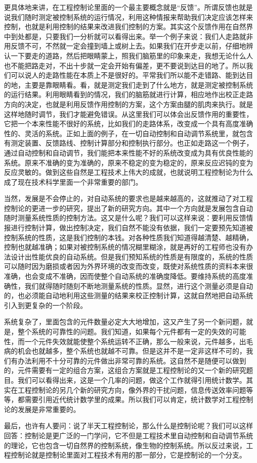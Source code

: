 更具体地来讲，在工程控制论里面的一个最主要概念就是“反馈”。所谓反馈也就是说我们随时测定被控制系统的运行情况，利用这种情报来帮助我们决定应该怎样来控制，也就是利用控制的结果来改进我们控制的方案。其实这个反馈作用在自然界中到处都是，只要我们一分析就可以看得出来。举一个例子来说：我们人走路就非用反馈不可，不然就一定会撞到墙上或树上去。如果我们在开步走以前，仔细地辨认一下要走的道路，然后把眼睛蒙上，照我们脑筋里的印象来走，我想无论什么人也不能把路走对，不出十步就一定会开始有偏差，更不要说到达目的地了。所以我们可以说人的走路性能在本质上不是很好的。平常我们所以能不走错路、能到达目的地，主要是靠眼睛看。看，就是测定我们走到了什么地方，就是测定被控制系统的运行结果。利用眼睛看到的情况，我们的脑筋就进行计算，相应地作出校正走路方向的决定，也就是利用反馈作用控制的方案，这个方案由腿的肌肉来执行。就是这样地随时调节，我们才能避免错误。从这里我们可以体会出反馈作用的重要性，它把一个本来性能不很好的系统，比如我们的走路体系，改变成一个具有高度准确性的、灵活的系统。正如上面的例子，在一切自动控制和自动调节系统里，就包含有测定装置、反馈路线、控制计算部分和控制执行部分。也正如走路这一个例子，通过自动控制和自动调节，我们能把本来性能不好的系统改变成为具有优良性能的系统。原来不准确的变为准确的，原来不稳定的变为稳定的，原来反应迟钝的变为反应灵敏的。做到这些自然是工程技术上伟大的成就，也就说明工程控制论为什么成了现在技术科学里面一个非常重要的部门。

当然，发展是不会停止的，对自动系统的要求也是越来越高的，这就推动了对工程控制论的更进一步的研究，提出了新的研究方向。其中一个方向就是发展包含自动随时测量系统性质的控制方法。这又是什么呢？我们可以这样来说：要利用反馈情报进行控制计算，做出控制决定，我们自然不能没有依据，我们一定要预先知道被控制系统的性质，这是我们控制的本钱。对各种性质我们知道得越清楚、越精确，控制也就越准确；如果对被控制系统的情况糊里糊涂，就是再好的工程师也没有办法设计出性能优良的自动系统。但是我们预知系统的性质是有限度的，系统的性质可以随时因为磨损或者因为外界环境的改变而改变，既使对系统性质的资料本来很准确，也会变成不准确，因而使整个自动系统的准确度降低。要维持系统的高度准确性，我们就得随时随刻不断地测量系统的性质。显然，进行这个测量必须是自动的，也必须能自动地利用这些测量的结果来校正控制计算，这就自然地把自动系统引入到更复杂的一个阶段。

系统复杂了，里面包含的元件数量必定大大地增加，这又产生了另一个新问题，就是，整个系统的可靠性的问题。我们知道，如果每个元件都有一定的失效的可能性，而一个元件失效就能使整个系统运转不正确，那么一般来说，元件越多，出毛病的机会也就越多，整个系统也就越不可靠。但是这并不是一定非这样不可的，我们有办法利用不十分可靠的元件做出非常可靠的系统。这自然不是随便可以做到的，元件需要有一定的组合方案，这组合方案就是工程控制论的又一个新的研究题目。我们可以看得出来，这是一个几率的问题，做这个工作就得引用统计数学。其实在工程控制论的另几个新的研究方向，像外界的干扰问题，信息传送效率问题等等，都需要引用近代统计数学里的成果。所以我们可以肯定，统计数学对工程控制论的发展是非常重要的。

最后，也许有人要问：说了半天工程控制论，那么什么是控制论呢？我们可以这样回答：控制论是更广泛的一门学问，它不但是工程技术里自动控制和自动调节系统的理论，它也包含一切自然界的控制系统，像生物的控制系统。所以反过来说，工程控制论就是控制论里面对工程技术有用的那一部分，它是控制论的一个分支。